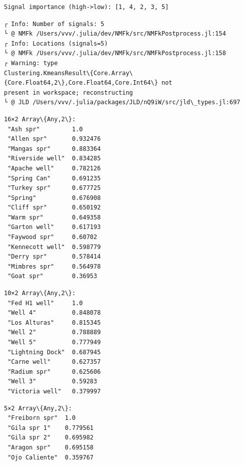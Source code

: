 \documentclass[11pt]{article}
\begin{document}
    \begin{Verbatim}[commandchars=\\\{\}]
Signal importance (high->low): [1, 4, 2, 3, 5]
    \end{Verbatim}

    \begin{Verbatim}[commandchars=\\\{\}]
┌ Info: Number of signals: 5
└ @ NMFk /Users/vvv/.julia/dev/NMFk/src/NMFkPostprocess.jl:154
┌ Info: Locations (signals=5)
└ @ NMFk /Users/vvv/.julia/dev/NMFk/src/NMFkPostprocess.jl:158
┌ Warning: type
Clustering.KmeansResult\{Core.Array\{Core.Float64,2\},Core.Float64,Core.Int64\} not
present in workspace; reconstructing
└ @ JLD /Users/vvv/.julia/packages/JLD/nQ9iW/src/jld\_types.jl:697
    \end{Verbatim}

    
    \begin{Verbatim}[commandchars=\\\{\}]
16×2 Array\{Any,2\}:
 "Ash spr"         1.0
 "Allen spr"       0.932476
 "Mangas spr"      0.883364
 "Riverside well"  0.834285
 "Apache well"     0.782126
 "Spring Can"      0.691235
 "Turkey spr"      0.677725
 "Spring"          0.676908
 "Cliff spr"       0.650192
 "Warm spr"        0.649358
 "Garton well"     0.617193
 "Faywood spr"     0.60702
 "Kennecott well"  0.598779
 "Derry spr"       0.578414
 "Mimbres spr"     0.564978
 "Goat spr"        0.36953
    \end{Verbatim}

    
    
    \begin{Verbatim}[commandchars=\\\{\}]
10×2 Array\{Any,2\}:
 "Fed H1 well"     1.0
 "Well 4"          0.848078
 "Los Alturas"     0.815345
 "Well 2"          0.788889
 "Well 5"          0.777949
 "Lightning Dock"  0.687945
 "Carne well"      0.627357
 "Radium spr"      0.625606
 "Well 3"          0.59283
 "Victoria well"   0.379997
    \end{Verbatim}

    
    
    \begin{Verbatim}[commandchars=\\\{\}]
5×2 Array\{Any,2\}:
 "Freiborn spr"  1.0
 "Gila spr 1"    0.779561
 "Gila spr 2"    0.695982
 "Aragon spr"    0.695158
 "Ojo Caliente"  0.359767
    \end{Verbatim}

    
    
\end{document}
